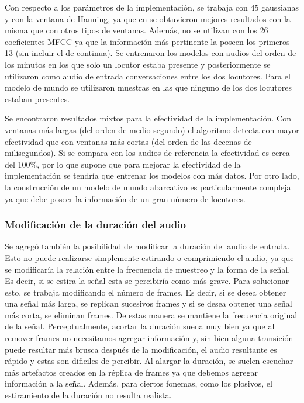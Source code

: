 \documentclass{article}
\begin{document}
Con respecto a los parámetros de la implementación, se trabaja con 45 gaussianas y con la ventana de Hanning, ya que en \cite{tiwari2010mfcc} se obtuvieron mejores resultados con la misma que con otros tipos de ventanas. Además, no se utilizan con los 26 coeficientes MFCC ya que la información más pertinente la poseen los primeros 13 (sin incluir el de continua). Se entrenaron los modelos con audios del orden de los minutos en los que solo un locutor estaba presente y posteriormente se utilizaron como audio de entrada conversaciones entre los dos locutores. Para el modelo de mundo se utilizaron muestras en las que ninguno de los dos locutores estaban presentes.

Se encontraron resultados mixtos para la efectividad de la implementación. Con ventanas más largas (del orden de medio segundo) el algoritmo detecta con mayor efectividad que con ventanas más cortas (del orden de las decenas de milisegundos). Si se compara con los audios de referencia la efectividad es cerca del 100\%, por lo que supone que para mejorar la efectividad de la implementación se tendría que entrenar los modelos con más datos. Por otro lado, la construcción de un modelo de mundo abarcativo es particularmente compleja ya que debe poseer la información de un gran número de locutores.

\subsubsection*{Modificación de la duración del audio}

Se agregó también la posibilidad de modificar la duración del audio de entrada. Esto no puede realizarse simplemente estirando o comprimiendo el audio, ya que se modificaría la relación entre la frecuencia de muestreo y la forma de la señal. Es decir, si se estira la señal esta se percibiría como más grave. Para solucionar esto, se trabaja modificando el número de frames. Es decir, si se desea obtener una señal más larga, se replican sucesivos frames y si se desea obtener una señal más corta, se eliminan frames. De estas manera se mantiene la frecuencia original de la señal. Perceptualmente, acortar la duración suena muy bien ya que al remover frames no necesitamos agregar información y, sin bien alguna transición puede resultar más brusca después de la modificación, el audio resultante es rápido y estas son dificiles de percibir. Al alargar la duración, se suelen escuchar más artefactos creados en la réplica de frames ya que debemos agregar información a la señal. Además, para ciertos fonemas, como los plosivos, el estiramiento de la duración no resulta realista. 
\end{document}
